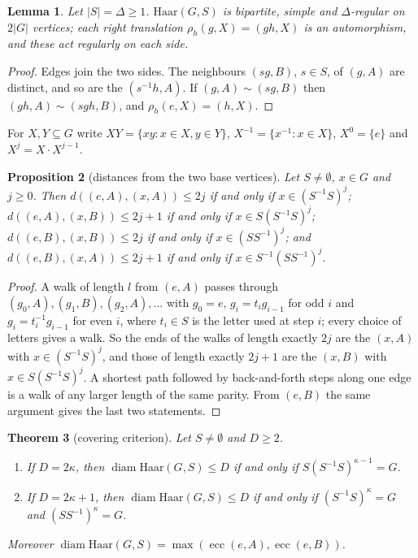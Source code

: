 \documentclass[11pt]{amsart}
\newtheorem{theorem}{Theorem}[section]
\newtheorem{lemma}[theorem]{Lemma}
\newtheorem{proposition}[theorem]{Proposition}
\theoremstyle{definition}
\theoremstyle{remark}
\numberwithin{equation}{section}
\newcommand{\diam}{\operatorname{diam}}
\newcommand{\ecc}{\operatorname{ecc}}
\begin{document}
\begin{lemma}\label{lem:haarbasic}
Let $|S|=\Delta\ge1$. $\mathrm{Haar}(G,S)$ is bipartite, simple and $\Delta$-regular on $2|G|$ vertices; each right translation
$\rho_h(g,X)=(gh,X)$ is an automorphism, and these act regularly on each side.
\end{lemma}

\begin{proof}
Edges join the two sides. The neighbours $(sg,B)$, $s\in S$, of $(g,A)$ are distinct, and so are the $(s^{-1}h,A)$. If $(g,A)\sim
(sg,B)$ then $(gh,A)\sim(sgh,B)$, and $\rho_h(e,X)=(h,X)$.
\end{proof}

For $X,Y\subseteq G$ write $XY=\{xy:x\in X,y\in Y\}$, $X^{-1}=\{x^{-1}:x\in X\}$, $X^0=\{e\}$ and $X^j=X\cdot X^{j-1}$.

\begin{proposition}[distances from the two base vertices]\label{prop:haardist}
Let $S\ne\emptyset$, $x\in G$ and $j\ge0$. Then $d((e,A),(x,A))\le2j$ if and only if $x\in(S^{-1}S)^j$;
$d((e,A),(x,B))\le2j+1$ if and only if $x\in S(S^{-1}S)^j$; $d((e,B),(x,B))\le2j$ if and only if $x\in(SS^{-1})^j$; and
$d((e,B),(x,A))\le2j+1$ if and only if $x\in S^{-1}(SS^{-1})^j$.
\end{proposition}

\begin{proof}
A walk of length $l$ from $(e,A)$ passes through $(g_0,A),(g_1,B),(g_2,A),\dots$ with $g_0=e$, $g_i=t_ig_{i-1}$ for odd $i$ and
$g_i=t_i^{-1}g_{i-1}$ for even $i$, where $t_i\in S$ is the letter used at step $i$; every choice of letters gives a walk. So
the ends of the walks of length exactly $2j$ are the $(x,A)$ with $x\in(S^{-1}S)^j$, and those of length exactly $2j+1$ are the
$(x,B)$ with $x\in S(S^{-1}S)^j$. A shortest path followed by back-and-forth steps along one edge is a walk of any larger length
of the same parity. From $(e,B)$ the same argument gives the last two statements.
\end{proof}

\begin{theorem}[covering criterion]\label{thm:covering}
Let $S\ne\emptyset$ and $D\ge2$.
\begin{enumerate}[label=(\alph*)]
\item If $D=2\kappa$, then $\diam \mathrm{Haar}(G,S)\le D$ if and only if $S(S^{-1}S)^{\kappa-1}=G$.
\item If $D=2\kappa+1$, then $\diam \mathrm{Haar}(G,S)\le D$ if and only if $(S^{-1}S)^\kappa=G$ and $(SS^{-1})^\kappa=G$.
\end{enumerate}
Moreover $\diam \mathrm{Haar}(G,S)=\max(\ecc(e,A),\ecc(e,B))$.
\end{theorem}
\end{document}
